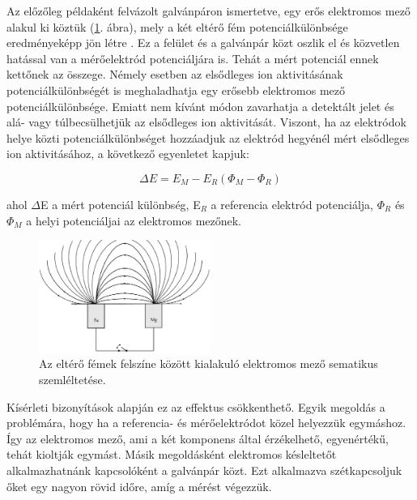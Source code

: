 Az előzőleg példaként felvázolt galvánpáron ismertetve, egy erős elektromos mező alakul ki köztük (\ref{fig:field}. ábra), mely a két eltérő fém potenciálkülönbsége eredményeképp jön létre \cite{kiss2017effect}. Ez a felület és a galvánpár közt oszlik el és közvetlen hatással van a mérőelektród potenciáljára is. Tehát a mért potenciál ennek kettőnek az összege. Némely esetben az elsődleges ion aktivitásának potenciálkülönbségét is meghaladhatja egy erősebb elektromos mező potenciálkülönbsége. Emiatt nem kívánt módon zavarhatja a detektált jelet és alá- vagy túlbecsülhetjük az elsődleges ion aktivitását. Viszont, ha az elektródok helye közti potenciálkülönbséget hozzáadjuk az elektród hegyénél mért elsődleges ion aktivitásához, a következő egyenletet kapjuk:

\begin{equation}
\Delta E = E_M - E_R (\Phi_M - \Phi_R) 
\label{eq:field1}
\end{equation}

ahol $\Delta$E a mért potenciál különbség, E$_R$ a referencia elektród potenciálja, $\Phi_R$ és $\Phi_M$ a helyi potenciáljai az elektromos mezőnek. 

\begin{figure}
\centering
\includegraphics[width=0.5\textwidth]{img/field.eps}
\caption{Az eltérő fémek felszíne között kialakuló elektromos mező sematikus szemléltetése.}
\label{fig:field}
\end{figure}

Kísérleti bizonyítások alapján ez az effektus csökkenthető. Egyik megoldás a problémára, hogy ha a referencia- és mérőelektródot közel helyezzük egymáshoz. Így az elektromos mező, ami a két komponens által érzékelhető, egyenértékű, tehát kioltják egymást. Másik megoldásként elektromos késleltetőt alkalmazhatnánk kapcsolóként a galvánpár közt. Ezt alkalmazva szétkapcsoljuk őket egy nagyon rövid időre, amíg a mérést végezzük.




